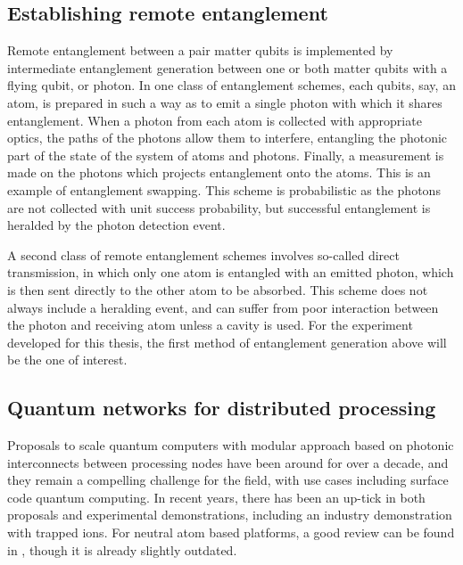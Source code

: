 \subsection{Establishing remote entanglement}\label{sec:reg}

Remote entanglement between a pair matter qubits is implemented by intermediate entanglement generation between one or both matter qubits with a flying qubit, or photon. In one class of entanglement schemes, each qubits, say, an atom, is prepared in such a way as to emit a single photon with which it shares entanglement. When a photon from each atom is collected with appropriate optics, the paths of the photons allow them to interfere, entangling the photonic part of the state of the system of atoms and photons. Finally, a measurement is made on the photons which projects entanglement onto the atoms. This is an example of entanglement swapping\cite{Zukowski1993}. This scheme is probabilistic as the photons are not collected with unit success probability, but successful entanglement is heralded by the photon detection event.

A second class of remote entanglement schemes involves so-called direct transmission, in which only one atom is entangled with an emitted photon, which is then sent directly to the other atom to be absorbed. This scheme does not always include a heralding event, and can suffer from poor interaction between the photon and receiving atom unless a cavity is used. For the experiment developed for this thesis, the first method of entanglement generation above will be the one of interest.

\subsection{Quantum networks for distributed processing}

Proposals to scale quantum computers with modular approach based on photonic interconnects between processing nodes have been around for over a decade\cite{Monroe2014modular}, and they remain a compelling challenge for the field, with use cases including surface code quantum computing\cite{Horsman2012}. In recent years, there has been an up-tick in both proposals\cite{li2024high, Young2022, Huie2021} and experimental demonstrations\cite{sinclair2024, hartung2024quantum, main2024}, including an industry demonstration with trapped ions\cite{IonQ2024}. For neutral atom based platforms, a good review can be found in \cite{Covey2023}, though it is already slightly outdated. 

